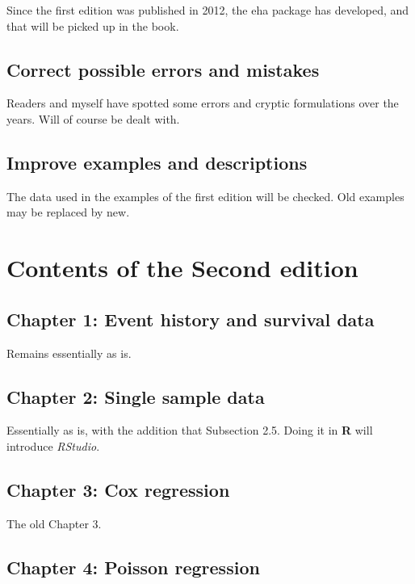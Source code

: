 \documentclass[a4paper,11pt]{article}
\begin{document}
Since the first edition was published in 2012, the eha package has
developed, and that will be picked up in the book.

\subsection{Correct possible errors and mistakes}

Readers and myself have spotted some errors and cryptic formulations over
the years. Will of course be dealt with.

\subsection{Improve examples and descriptions}

The data used in the examples of the first edition will be checked. Old
examples may be replaced by new.  

\section{Contents of the Second edition} \label{sec:contents}

\subsection*{Chapter 1: Event history and survival data}

Remains essentially as is.

\subsection*{Chapter 2: Single sample data}

Essentially as is, with the addition that Subsection 2.5. Doing it in {\bf
  R} will introduce \emph{RStudio}.




\subsection*{Chapter 3: Cox regression}

The old Chapter 3.

\subsection*{Chapter 4: Poisson regression}
\end{document}
